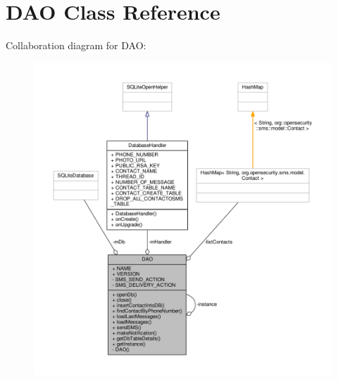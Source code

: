 \hypertarget{a00009}{\section{D\+A\+O Class Reference}
\label{a00009}
}


Collaboration diagram for D\+A\+O\+:
\nopagebreak
\begin{figure}[H]
\begin{center}
\leavevmode
\includegraphics[width=350pt]{a00046}
\end{center}
\end{figure}
